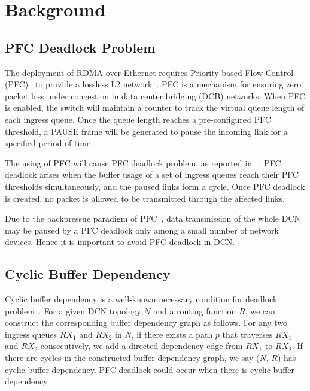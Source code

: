 \section{Background}\label{sec:background}

\subsection{PFC Deadlock Problem}\label{subsec:pfcdeadlock}

The deployment of RDMA over Ethernet requires Priority-based Flow Control (PFC)~\cite{pfc}  to provide a lossless L2 network~\cite{dcqcn, rdmaatscale}. 
PFC is a mechanism for ensuring zero packet loss under congestion in data center bridging (DCB) networks. When PFC is enabled, the switch will maintain a counter to track the virtual queue length of each ingress queue. Once the queue length reaches a pre-configured PFC threshold, a PAUSE frame will be generated to pause the incoming link for a specified period of time.

The using of PFC will cause PFC deadlock problem, as reported in ~\cite{rdmaatscale}. PFC deadlock arises when the buffer usage of a set of ingress queues reach their PFC thresholds simultaneously, and the paused links form a cycle. Once PFC deadlock is created, no packet is allowed to be transmitted through the affected links. 

Due to the backpressue paradigm of PFC~\cite{tcp-bolt,dcqcn}, data transmission of the whole DCN may be paused by a PFC deadlock only among a small number of network devices. Hence it is important to avoid PFC deadlock in DCN.



\subsection{Cyclic Buffer Dependency}\label{subsec:cyclicbd}

Cyclic buffer dependency is a well-known necessary condition for deadlock problem~\cite{gerla1980flow,dally}. For a given DCN topology $N$ and a routing function $R$, we can construct the corresponding buffer dependency graph as follows. For any two ingress queues $RX_1$ and $RX_2$ in $N$, if there exists a path $p$ that traverses $RX_1$ and  $RX_2$ consecutively, we add a directed dependency edge from $RX_1$ to $RX_2$.  If there are cycles in the constructed buffer dependency graph, we say ($N$, $R$) has cyclic buffer dependency. PFC deadlock could occur when there is cyclic buffer dependency.

